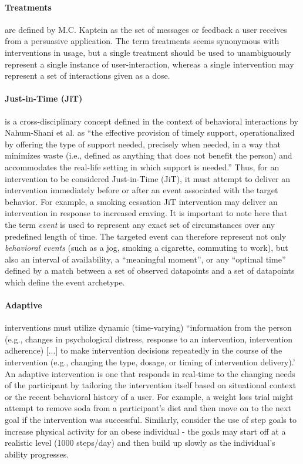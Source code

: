 \documentclass[runningheads,a4paper]{llncs}
\begin{document}
\paragraph{Treatments} are defined by M.C. Kaptein \cite{kaptein2015formalizing} as the set of messages or feedback a user receives from a persuasive application. 
The term treatments seems synonymous with interventions in usage, but a single treatment should be used to unambiguously represent a single instance of user-interaction, whereas a single intervention may represent a set of interactions given as a dose.

\paragraph{Just-in-Time (JiT)} is a cross-disciplinary concept defined in the context of behavioral interactions by Nahum-Shani et al. as ``the effective provision of timely support, operationalized by offering the type of support needed, precisely when needed, in a way that minimizes waste (i.e., defined as anything that does not benefit the person) and accommodates the real-life setting in which support is needed.'' \cite{nahum2014}
Thus, for an intervention to be considered Just-in-Time (JiT), it must attempt to deliver an intervention immediately before or after an event associated with the target behavior. 
For example, a smoking cessation JiT intervention may deliver an intervention in response to increased craving.
It is important to note here that the term \emph{event} is used to represent any exact set of circumstances over any predefined length of time.
The targeted event can therefore represent not only \emph{behavioral events} (such as a jog, smoking a cigarette, commuting to work), but also an interval of availability, a ``meaningful moment'', or any ``optimal time'' defined by a match between a set of observed datapoints and a set of datapoints which define the event archetype.

\paragraph{Adaptive} interventions must utilize dynamic (time-varying) ``information from the person (e.g., changes in psychological distress, response to an intervention, intervention adherence) [...] to make intervention decisions repeatedly in the course of the intervention (e.g., changing the type, dosage, or timing of intervention delivery).' \cite{nahum2014}
An adaptive intervention is one that responds in real-time to the changing needs of the participant by tailoring the intervention itself based on situational context or the recent behavioral history of a user. 
For example, a weight loss trial might attempt to remove soda from a participant's diet and then move on to the next goal if the intervention was successful.
Similarly, consider the use of step goals to increase physical activity for an obese individual - the goals may start off at a realistic level (1000 steps/day) and then build up slowly as the individual's ability progresses.
\end{document}
